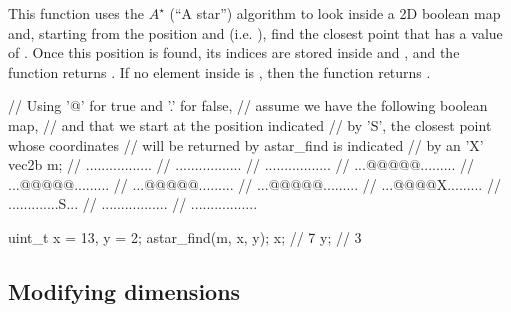 \documentclass[12pt]{report}
\newenvironment{example}
{
    \begin{mdframed}[style=example,frametitle={Example}]
}
{
    \end{mdframed}
}
\begin{document}
\begin{itemize}
This function uses the $A^\star$ (``A star'') algorithm to look inside a 2D boolean map  and, starting from the position  and  (i.e. ), find the closest point that has a value of . Once this position is found, its indices are stored inside  and , and the function returns . If no element inside  is , then the function returns .

\begin{example}
\begin{cppcode}
// Using '@' for true and '.' for false,
// assume we have the following boolean map,
// and that we start at the position indicated
// by 'S', the closest point whose coordinates
// will be returned by astar_find is indicated
// by an 'X'
vec2b m;
// .................
// .................
// .................
// ...@@@@@.........
// ...@@@@@.........
// ...@@@@@.........
// ...@@@@@.........
// ...@@@@X.........
// .............S...
// .................
// .................

uint_t x = 13, y = 2;
astar_find(m, x, y);
x; // 7
y; // 3
\end{cppcode}
\end{example}
\end{itemize}

\subsection{Modifying dimensions}
\end{document}
